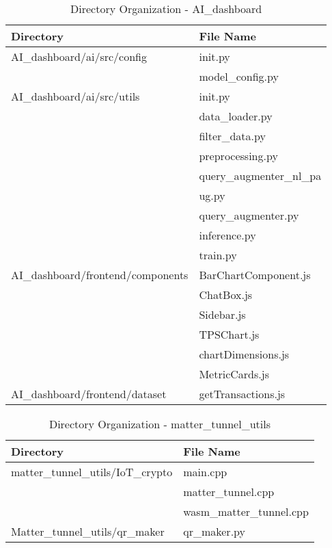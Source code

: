 \documentclass[conference]{IEEEtran}
\begin{document}
\begin{table}[h]
	\caption{Directory Organization - AI\_dashboard}
	\def\arraystretch{1.24} \small
	\begin{tabular}{|p{4.5cm}|p{3cm}|}
		\hline
		Directory                         & File Name                \\
		\hline
		AI\_dashboard/ai/src/config       & init.py                  \\
		                                  & model\_config.py         \\
		\hline
		AI\_dashboard/ai/src/utils        & init.py                  \\
		                                  & data\_loader.py          \\
		                                  & filter\_data.py          \\
		                                  & preprocessing.py         \\
		                                  & query\_augmenter\_nl\_pa \\
		                                  & ug.py                    \\
		                                  & query\_augmenter.py      \\
		                                  & inference.py             \\
		                                  & train.py                 \\
		\hline
		AI\_dashboard/frontend/components & BarChartComponent.js     \\
		                                  & ChatBox.js               \\
		                                  & Sidebar.js               \\
		                                  & TPSChart.js              \\
		                                  & chartDimensions.js       \\
		                                  & MetricCards.js           \\
		\hline
		AI\_dashboard/frontend/dataset    & getTransactions.js       \\
		\hline
	\end{tabular}
\end{table}

\begin{table}[h]
	\caption{Directory Organization - matter\_tunnel\_utils}
	\def\arraystretch{1.24} \small
	\begin{tabular}{|p{4.4cm}|p{3cm}|}
		\hline
		Directory                         & File Name                \\
		\hline
		matter\_tunnel\_utils/IoT\_crypto & main.cpp                 \\
		                                  & matter\_tunnel.cpp       \\
		                                  & wasm\_matter\_tunnel.cpp \\
		\hline
		Matter\_tunnel\_utils/qr\_maker   & qr\_maker.py             \\
		\hline
	\end{tabular}
\end{table}
\end{document}

